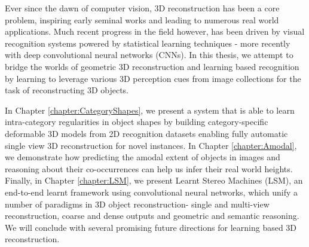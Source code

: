 

Ever since the dawn of computer vision, 3D reconstruction has been a core problem, inspiring early seminal works and leading to numerous real world applications. Much recent progress in the field however, has been driven by visual recognition systems powered by statistical learning techniques - more recently with deep convolutional neural networks (CNNs). In this thesis, we attempt to bridge the worlds of geometric 3D reconstruction and learning based recognition by learning to leverage various 3D perception cues from image collections for the task of reconstructing 3D objects.

In Chapter \ref{chapter:CategoryShapes}, we present a system that is able to learn intra-category regularities in object shapes by building category-specific deformable 3D models from 2D recognition datasets enabling fully automatic single view 3D reconstruction for novel instances. In Chapter \ref{chapter:Amodal}, we demonstrate how predicting the amodal extent of objects in images and reasoning about their co-occurrences can help us infer their real world heights. Finally, in Chapter \ref{chapter:LSM}, we present Learnt Stereo Machines (LSM), an end-to-end learnt framework using convolutional neural networks, which unify a number of paradigms in 3D object reconstruction- single and multi-view reconstruction, coarse and dense outputs and geometric and semantic reasoning. We will conclude with several promising future directions for learning based 3D reconstruction.

